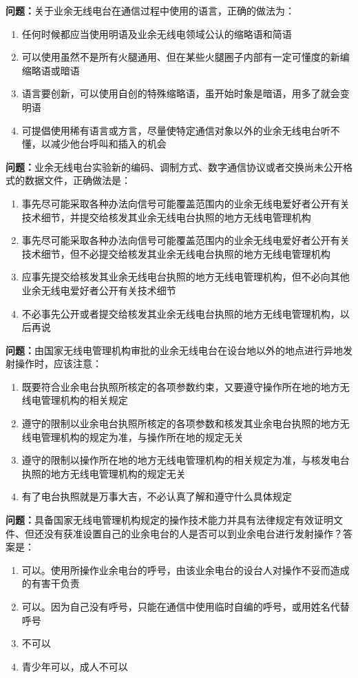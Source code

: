 \documentclass{ctexbook}
\begin{document}
\textbf{问题：}关于业余无线电台在通信过程中使用的语言，正确的做法为：
\begin{enumerate}[label=\Alph*), leftmargin=3em]
\item 任何时候都应当使用明语及业余无线电领域公认的缩略语和简语
\item 可以使用虽然不是所有火腿通用、但在某些火腿圈子内部有一定可懂度的新编缩略语或暗语
\item 语言要创新，可以使用自创的特殊缩略语，虽开始时象是暗语，用多了就会变明语
\item 可提倡使用稀有语言或方言，尽量使特定通信对象以外的业余无线电台听不懂，以减少他台呼叫和插入的机会
\end{enumerate}

\textbf{问题：}业余无线电台实验新的编码、调制方式、数字通信协议或者交换尚未公开格式的数据文件，正确做法是：
\begin{enumerate}[label=\Alph*), leftmargin=3em]
\item 事先尽可能采取各种办法向信号可能覆盖范围内的业余无线电爱好者公开有关技术细节，并提交给核发其业余无线电台执照的地方无线电管理机构
\item 事先尽可能采取各种办法向信号可能覆盖范围内的业余无线电爱好者公开有关技术细节，但不必提交给核发其业余无线电台执照的地方无线电管理机构
\item 应事先提交给核发其业余无线电台执照的地方无线电管理机构，但不必向其他业余无线电爱好者公开有关技术细节
\item 不必事先公开或者提交给核发其业余无线电台执照的地方无线电管理机构，以后再说
\end{enumerate}

\textbf{问题：}由国家无线电管理机构审批的业余无线电台在设台地以外的地点进行异地发射操作时，应该注意：
\begin{enumerate}[label=\Alph*), leftmargin=3em]
\item 既要符合业余电台执照所核定的各项参数约束，又要遵守操作所在地的地方无线电管理机构的相关规定
\item 遵守的限制以业余电台执照所核定的各项参数和核发其业余电台执照的地方无线电管理机构的规定为准，与操作所在地的规定无关
\item 遵守的限制以操作所在地的地方无线电管理机构的相关规定为准，与核发电台执照的地方无线电管理机构的规定无关
\item 有了电台执照就是万事大吉，不必认真了解和遵守什么具体规定
\end{enumerate}

\textbf{问题：}具备国家无线电管理机构规定的操作技术能力并具有法律规定有效证明文件、但还没有获准设置自己的业余电台的人是否可以到业余电台进行发射操作？答案是：
\begin{enumerate}[label=\Alph*), leftmargin=3em]
\item 可以。使用所操作业余电台的呼号，由该业余电台的设台人对操作不妥而造成的有害干负责
\item 可以。因为自己没有呼号，只能在通信中使用临时自编的呼号，或用姓名代替呼号
\item 不可以
\item 青少年可以，成人不可以
\end{enumerate}
\end{document}

